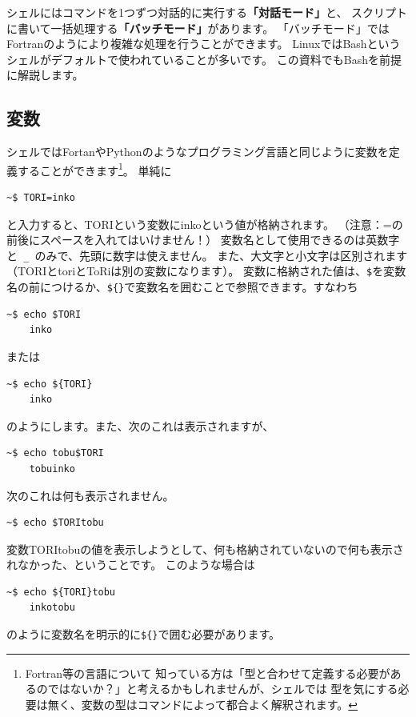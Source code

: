 \documentclass[a4j]{ltjreport}
\begin{document}
    シェルにはコマンドを1つずつ対話的に実行する\textbf{「対話モード」}と、
    スクリプトに書いて一括処理する\textbf{「バッチモード」}があります。
    「バッチモード」ではFortranのようにより複雑な処理を行うことができます。
    LinuxではBashというシェルがデフォルトで使われていることが多いです。
    この資料でもBashを前提に解説します。

    \subsection{変数}
    シェルではFortanやPythonのようなプログラミング言語と同じように変数を定義することができます\footnote{Fortran等の言語について
    知っている方は「型と合わせて定義する必要があるのではないか？」と考えるかもしれませんが、シェルでは
    型を気にする必要は無く、変数の型はコマンドによって都合よく解釈されます。}。
    単純に
    \begin{lstlisting}[numbers=none]
    ~$ TORI=inko
    \end{lstlisting}
    と入力すると、TORIという変数にinkoという値が格納されます。
    （注意：=の前後にスペースを入れてはいけません！）
    変数名として使用できるのは英数字と\texttt{ \_ }のみで、先頭に数字は使えません。
    また、大文字と小文字は区別されます（TORIとtoriとToRiは別の変数になります）。
    変数に格納された値は、\texttt{\$}を変数名の前につけるか、\texttt{\$\{\quad\}}で変数名を囲むことで参照できます。すなわち
    \begin{lstlisting}[numbers=none]
    ~$ echo $TORI
    inko
    \end{lstlisting}
    または
    \begin{lstlisting}[numbers=none]
    ~$ echo ${TORI}
    inko
    \end{lstlisting}
    のようにします。また、次のこれは表示されますが、
    \begin{lstlisting}[numbers=none]
    ~$ echo tobu$TORI
    tobuinko
    \end{lstlisting}
    次のこれは何も表示されません。
    \begin{lstlisting}[numbers=none]
    ~$ echo $TORItobu
    \end{lstlisting}
    変数TORItobuの値を表示しようとして、何も格納されていないので何も表示されなかった、ということです。
    このような場合は
    \begin{lstlisting}[numbers=none]
    ~$ echo ${TORI}tobu
    inkotobu
    \end{lstlisting}
    のように変数名を明示的に\texttt{\$\{\quad\}}で囲む必要があります。
\end{document}
